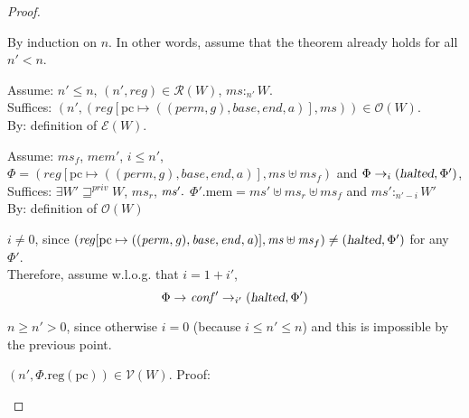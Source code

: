 \documentclass[a4paper]{article}
\newcommand{\update}[2]{[#1 \mapsto #2]}
\newcommand{\var}[1]{\mathit{#1}}
\newcommand{\hs}{\var{ms}}
\newcommand{\ms}{\hs}
\newcommand{\gl}{\var{g}}
\newcommand{\pcreg}{\mathrm{pc}}
\newcommand{\addr}{\var{a}}
\newcommand{\start}{\var{base}}
\newcommand{\addrend}{\var{end}}
\newcommand{\reg}{\var{reg}}
\newcommand{\heap}{\var{mem}}
\newcommand{\perm}{\var{perm}}
\newcommand{\plainproj}[1]{\mathrm{#1}}
\newcommand{\memheap}[1][\Phi]{#1.\plainproj{mem}}
\newcommand{\memreg}[1][\Phi]{#1.\plainproj{reg}}
\newcommand{\halted}{\textsl{halted}}
\newcommand{\plainfun}[2]{
  \ifthenelse{\equal{#2}{}}
  {\mathit{#1}}
  {\mathit{#1}(#2)}
}
\newcommand{\execCond}[1]{\plainfun{executeCondition}{#1}}
\newcommand{\future}{\mathbin{\sqsupseteq}}
\newcommand{\futurewk}{\mathbin{\sqsupseteq}^{\var{pub}}}
\newcommand{\futurestr}{\mathbin{\sqsupseteq}^{\var{priv}}}
\newcommand{\heapSat}[3][\heap]{#1 :_{#2} #3}
\newcommand{\asmType}{\plaindom{AsmType}}
\newcommand{\plaindom}[1]{\mathrm{#1}}
\newcommand{\intr}[2]{\mathcal{#1}}
\newcommand{\valueintr}[1]{\intr{V}{#1}}
\newcommand{\exprintr}[1]{\intr{E}{#1}}
\newcommand{\regintr}[1]{\intr{R}{#1}}
\newcommand{\stdvr}{\valueintr{\asmType}}
\newcommand{\stder}{\exprintr{\asmType}}
\newcommand{\stdrr}{\regintr{\asmType}}
\newcommand{\observations}{\mathcal{O}}
\newcommand{\npair}[2][n]{\left(#1,#2 \right)}
\newcommand{\plainperm}[1]{\mathrm{#1}}
\newcommand{\exec}{\plainperm{rx}}
\newcommand{\rwx}{\plainperm{rwx}}
\newcommand{\rwlx}{\plainperm{rwlx}}
\newcommand{\local}{\plainperm{local}}
\newcommand{\glob}{\plainperm{global}}
\newcommand{\step}[1][]{\rightarrow_{#1}}
\begin{document}
\begin{proof}
  \begin{enumproof}
  \item By induction on $n$. In other words, assume that the theorem already
    holds for all $n' < n$.
  \item Assume: $n' \leq n$, $\npair[n']{\reg}\in \stdrr(W)$, $\heapSat[\hs]{n'}{W}$.\\
    Suffices: $\npair[n']{(\reg\update{\pcreg}{((\perm,\gl),\start,\addrend,\addr)},\hs)}\in\observations(W)$.\\
    By: definition of $\stder(W)$.
  \item Assume: $\ms_f$, $\heap'$, $i \leq n'$, $\Phi =
    (\reg\update{\pcreg}{((\perm,\gl),\start,\addrend,\addr)},\hs \uplus \ms_f)$
    and $\Phi \step[i] (\halted,\Phi')$,\\
    Suffices: $\exists W' \futurestr W$, $\hs_r$, $\hs' \ldotp$
    $\memheap[\Phi'] = \hs' \uplus \hs_r \uplus \ms_f$ and $\heapSat[\hs']{n'-i}{W'}$\\
    By: definition of $\observations(W)$ \label{suff-after-eval}
  \item $i \neq 0$, since
    $(\reg\update{\pcreg}{((\perm,\gl),\start,\addrend,\addr)},\hs \uplus
    \ms_f)\neq (\halted,\Phi')$ for any $\Phi'$. \\
    Therefore, assume w.l.o.g. that $i = 1+i'$,
    \begin{equation*}
      \Phi \step \var{conf'} \step[i'] (\halted,\Phi')
    \end{equation*} \label{step:ip-non-zero}
  \item $n \geq n' > 0$, since otherwise $i = 0$ (because $i \leq n'\leq n$) and this is
    impossible by the previous point.
  \item $\npair[n']{\memreg(\pcreg)}\in\stdvr(W)$. \label{step:ftlr-pc-vr}
    Proof:
\end{enumproof}
\end{proof}
\end{document}
